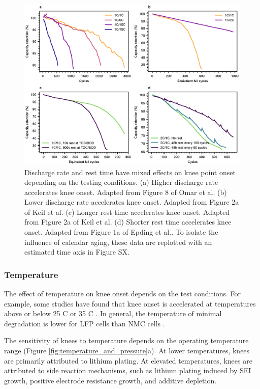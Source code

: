 \documentclass[journal=jpclcd,manuscript=article]{achemso}
\begin{document}
\begin{figure}[ht!]
\centering
\includegraphics[scale = 1.0]{figures/discharge_rate_rest_cycles.eps}
\caption{Discharge rate and rest time have mixed effects on knee point onset depending on the testing conditions. (a) Higher discharge rate accelerates knee onset. Adapted from Figure 8 of Omar et al.\cite{omar_lithium_2014} (b) Lower discharge rate accelerates knee onset. Adapted from Figure 2a of Keil et al.\cite{keil_linear_2019} (c) Longer rest time accelerates knee onset. Adapted from  Figure 2a of Keil et al.\cite{keil_linear_2019} (d) Shorter rest time accelerates knee onset. Adapted from Figure 1a of Epding et al.\cite{epding_investigation_2019}. To isolate the influence of calendar aging, these data are replotted with an estimated time axis in Figure SX.}
\label{fig:discharge-rest_cycle}
\end{figure}


\subsubsection{Temperature}
The effect of temperature on knee onset depends on the test conditions. For example, some studies have found that knee onset is accelerated at temperatures above or below 25 \degree C \cite{zhang_accelerated_2019, waldmann_temperature_2014, waldmann_optimization_2015} or 35 \degree C \cite{schuster_nonlinear_2015}. In general, the temperature of minimal degradation is lower for LFP cells than NMC cells \cite{preger_degradation_2020}. 

The sensitivity of knees to temperature depends on the operating temperature range (Figure \ref{fig:temperature_and_pressure}a). At lower temperatures, knees are primarily attributed to lithium plating. At elevated temperatures, knees are attributed to side reaction mechanisms, such as lithium plating induced by SEI growth, positive electrode resistance growth, and additive depletion.\cite {zhang_accelerated_2019,schuster_nonlinear_2015,waldmann_temperature_2014,waldmann_optimization_2015}
\end{document}
